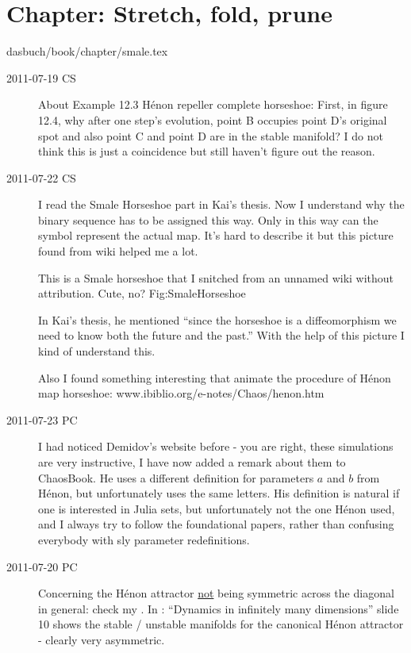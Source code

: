 \section{Chapter: Stretch, fold, prune}
\label{c-smale}\noindent dasbuch/book/chapter/smale.tex
\begin{description}

\item[2011-07-19 CS]
About Example 12.3 H\'enon repeller complete horseshoe:
First, in figure 12.4, why after one step's evolution, point B occupies
point D's original spot and also point C and point D are in the stable
manifold? I do not think this is just a coincidence but still haven't
figure out the reason.

\item[2011-07-22 CS] I read the Smale Horseshoe part in Kai's thesis. Now
I understand why the binary sequence has to be assigned this way. Only in
this way can the symbol represent the actual map. It's hard to describe
it but this picture found from wiki helped me a lot.

{}{
This is a Smale horseshoe that I snitched from an unnamed wiki
without attribution. Cute, no?
    }{Fig:SmaleHorseshoe}

In Kai's thesis, he mentioned ``since the horseshoe is a diffeomorphism
we need to know both the future and the past.'' With the help of this
picture I kind of understand this.

Also I found something interesting that animate the procedure of H\'enon
map horseshoe:
{www.ibiblio.org/e-notes/Chaos/henon.htm}

\item[2011-07-23 PC]                                        \inCB
I had noticed Demidov's website before - you are right, these simulations
are very instructive, I have now added a remark about them to ChaosBook.
He uses a different definition for parameters $a$ and $b$ from H\'enon,
but unfortunately uses the same letters. His definition is natural if one
is interested in Julia sets, but unfortunately not the one H\'enon used,
and I always try to follow the foundational papers, rather than confusing
everybody with sly parameter redefinitions.


\item[2011-07-20 PC]                                        \toCB
Concerning the H\'enon attractor \underline{not} being symmetric across
the diagonal in general: check my
.
In : ``Dynamics in infinitely many dimensions'' slide 10 shows the
stable / unstable manifolds for the canonical H\'enon attractor - clearly
very asymmetric.


\end{description}

